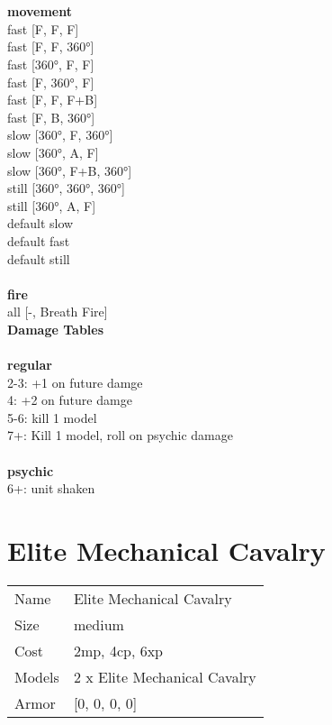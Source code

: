  
\ \\



\ \\ {\bf movement } \\
fast [F, F, F] \\
fast [F, F, 360°] \\
fast [360°, F, F] \\
fast [F, 360°, F] \\
fast [F, F, F+B] \\
fast [F, B, 360°] \\
slow [360°, F, 360°] \\
slow [360°, A, F] \\
slow [360°, F+B, 360°] \\
still [360°, 360°, 360°] \\
still [360°, A, F] \\
default slow \\
default fast \\
default still \\
\ \\ {\bf fire } \\
all [-, Breath Fire] \\


{\bf Damage Tables} \\
\ \\ {\bf regular } \\
2-3: +1 on future damge \\
4: +2 on future damge \\
5-6: kill 1 model \\
7+: Kill 1 model, roll on psychic damage \\
\ \\ {\bf psychic } \\
6+: unit shaken \\










\pagebreak\pagebreak

\section{ Elite Mechanical Cavalry }

\begin{tabular}{ll}
  Name & Elite Mechanical Cavalry \\
  Size & medium\\
  Cost & 2mp, 4cp, 6xp\\
  Models & 2 x Elite Mechanical Cavalry\\
  Armor & [0, 0, 0, 0]\\
\end{tabular}

